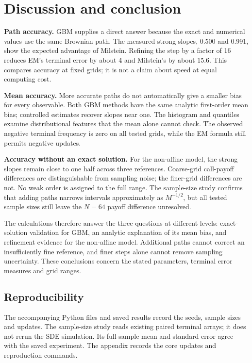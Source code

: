 \documentclass[11pt,a4paper]{article}
\begin{document}
\newpage
\section{Discussion and conclusion}
\textbf{Path accuracy.} GBM supplies a direct answer because the exact and numerical values use the same Brownian path. The measured strong slopes, 0.500 and 0.991, show the expected advantage of Milstein. Refining the step by a factor of 16 reduces EM's terminal error by about 4 and Milstein's by about 15.6. This compares accuracy at fixed grids; it is not a claim about speed at equal computing cost.

\textbf{Mean accuracy.} More accurate paths do not automatically give a smaller bias for every observable. Both GBM methods have the same analytic first-order mean bias; controlled estimates recover slopes near one. The histogram and quantiles examine distributional features that the mean alone cannot check. The observed negative terminal frequency is zero on all tested grids, while the EM formula still permits negative updates.

\textbf{Accuracy without an exact solution.} For the non-affine model, the strong slopes remain close to one half across three references. Coarse-grid call-payoff differences are distinguishable from sampling noise; the finer-grid differences are not. No weak order is assigned to the full range. The sample-size study confirms that adding paths narrows intervals approximately as $M^{-1/2}$, but all tested sample sizes still leave the $N=64$ payoff difference unresolved.

The calculations therefore answer the three questions at different levels: exact-solution validation for GBM, an analytic explanation of its mean bias, and refinement evidence for the non-affine model. Additional paths cannot correct an insufficiently fine reference, and finer steps alone cannot remove sampling uncertainty. These conclusions concern the stated parameters, terminal error measures and grid ranges.

\subsection*{Reproducibility}
The accompanying Python files and saved results record the seeds, sample sizes and updates. The sample-size study reads existing paired terminal arrays; it does not rerun the SDE simulation. Its full-sample mean and standard error agree with the saved experiment. The appendix records the core updates and reproduction commands.
\end{document}
